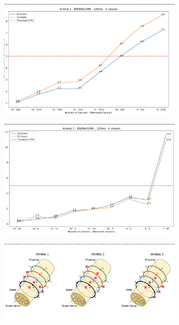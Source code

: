 \documentclass{Configuration_Files/PoliMi3i_thesis}
\begin{document}
\begin{figure}[h!]
    \centering
    \includegraphics[width=0.8\textwidth]{Results Matteo/figure7}
    \label{fig:figure1}
\end{figure}

\begin{figure}[h!]
    \centering
    \includegraphics[width=0.8\textwidth]{Results Matteo/figure8}
    \label{fig:figure1}
\end{figure}

\begin{figure}[h!]
    \centering
    \includegraphics[width=0.8\textwidth]{Results Matteo/figure9}
    \label{fig:figure1}
\end{figure}
\end{document}
